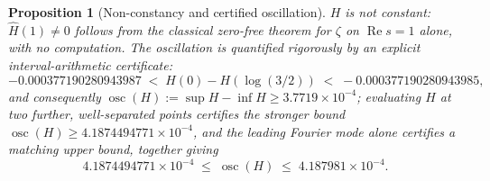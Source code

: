 \documentclass[11pt]{amsart}
\theoremstyle{plain}
\newtheorem{proposition}[theorem]{Proposition}
\theoremstyle{definition}
\theoremstyle{remark}
\begin{document}
\begin{proposition}[Non-constancy and certified oscillation]
\label{prop:Hcert}
$H$ is not constant: $\hat H(1)\ne0$ follows from the classical zero-free theorem for $\zeta$ on
$\operatorname{Re}s=1$ alone, with no computation. The oscillation is quantified rigorously by an
explicit interval-arithmetic certificate:
\[
-0.000377190280943987 \;<\; H(0) - H(\log(3/2)) \;<\; -0.000377190280943985,
\]
and consequently $\operatorname{osc}(H) := \sup H - \inf H \ge 3.7719\times 10^{-4}$; evaluating $H$
at two further, well-separated points certifies the stronger bound
$\operatorname{osc}(H) \ge 4.1874494771\times10^{-4}$, and the leading Fourier mode alone certifies
a matching upper bound, together giving
\[
4.1874494771\times10^{-4} \;\le\; \operatorname{osc}(H) \;\le\; 4.187981\times10^{-4}.
\]
\end{proposition}
\end{document}
